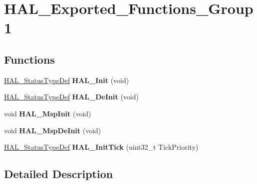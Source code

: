 \hypertarget{group___h_a_l___exported___functions___group1}{}\section{H\+A\+L\+\_\+\+Exported\+\_\+\+Functions\+\_\+\+Group1}
\label{group___h_a_l___exported___functions___group1}
\subsection*{Functions}
\begin{DoxyCompactItemize}
\item 
\mbox{\label{group___h_a_l___exported___functions___group1_gaecac54d350c3730e6831eb404e557dc4}} 
\hyperlink{stm32f1xx__hal__def_8h_a63c0679d1cb8b8c684fbb0632743478f}{H\+A\+L\+\_\+\+Status\+Type\+Def} {\bfseries H\+A\+L\+\_\+\+Init} (void)
\item 
\mbox{\label{group___h_a_l___exported___functions___group1_ga95911129a26afb05232caaaefa31956f}} 
\hyperlink{stm32f1xx__hal__def_8h_a63c0679d1cb8b8c684fbb0632743478f}{H\+A\+L\+\_\+\+Status\+Type\+Def} {\bfseries H\+A\+L\+\_\+\+De\+Init} (void)
\item 
\mbox{\label{group___h_a_l___exported___functions___group1_gae4fb8e66865c87d0ebab74a726a6891f}} 
void {\bfseries H\+A\+L\+\_\+\+Msp\+Init} (void)
\item 
\mbox{\label{group___h_a_l___exported___functions___group1_gadd10d026ef02d00e32e80c9eab9db830}} 
void {\bfseries H\+A\+L\+\_\+\+Msp\+De\+Init} (void)
\item 
\mbox{\label{group___h_a_l___exported___functions___group1_ga879cdb21ef051eb81ec51c18147397d5}} 
\hyperlink{stm32f1xx__hal__def_8h_a63c0679d1cb8b8c684fbb0632743478f}{H\+A\+L\+\_\+\+Status\+Type\+Def} {\bfseries H\+A\+L\+\_\+\+Init\+Tick} (uint32\+\_\+t Tick\+Priority)
\end{DoxyCompactItemize}


\subsection{Detailed Description}
